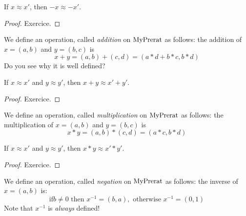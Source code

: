 \begin{lemma}
    \label{MyPrerat.neg_quotient}
    \leanok
If $x \approx x'$, then $-x \approx -x'$.
\end{lemma}
\begin{proof}
\leanok
Exercice.
\end{proof}

\begin{definition}
    \label{MyPrerat.add}
    \leanok
We define an operation, called \emph{addition} on $\mathrm{MyPrerat}$ as follows: the addition of $x = (a,b)$
and $y = (b, c)$ is
\[
x + y = (a,b) + (c,d) = (a * d + b * c, b*d)
\]
Do you see why it is well defined?
\end{definition}

\begin{lemma}
    \label{MyPrerat.add_quotient}
    \leanok
If $x \approx x'$ and $y \approx y'$, then $x + y \approx x' + y'$.
\end{lemma}
\begin{proof}
\leanok
Exercice.
\end{proof}

\begin{definition}
    \label{MyPrerat.mul}
    \leanok
We define an operation, called \emph{multiplication} on $\mathrm{MyPrerat}$ as follows: the multiplication of $x = (a,b)$ and $y = (b, c)$ is
\[
x * y = (a,b) * (c,d) = (a*c, b*d)
\]
\end{definition}

\begin{lemma}
    \label{MyPrerat.mul_quotient}
    \leanok
If $x \approx x'$ and $y \approx y'$, then $x * y \approx x' * y'$.
\end{lemma}
\begin{proof}
\leanok
Exercice.
\end{proof}

\begin{definition}
    \label{MyPrerat.inv}
    \leanok
We define an operation, called \emph{negation} on $\mathrm{MyPrerat}$ as follows: the inverse of $x = (a,b)$ is:
\[
\mbox{if} b \neq 0 \mbox{ then } x^{-1} = (b, a), \mbox{ otherwise } x^{-1} = (0, 1)
\]
Note that $x^{-1}$ is \emph{always} defined!
\end{definition}

